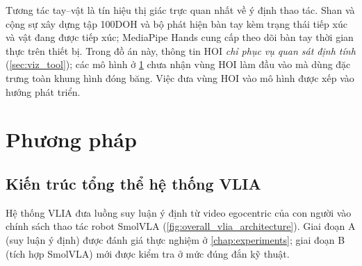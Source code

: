 \documentclass[12pt,a4paper]{report}
\begin{document}
Tương tác tay--vật là tín hiệu thị giác trực quan nhất về ý định thao tác. Shan và cộng sự \citep{shan2020100doh} xây dựng tập 100DOH và bộ phát hiện bàn tay kèm trạng thái tiếp xúc và vật đang được tiếp xúc; MediaPipe Hands \citep{zhang2020mediapipe} cung cấp theo dõi bàn tay thời gian thực trên thiết bị. Trong đồ án này, thông tin HOI \emph{chỉ phục vụ quan sát định tính} (\cref{sec:viz_tool}); các mô hình ở \cref{chap:method} chưa nhận vùng HOI làm đầu vào mà dùng đặc trưng toàn khung hình đóng băng. Việc đưa vùng HOI vào mô hình được xếp vào hướng phát triển.

\chapter{Phương pháp}
\label{chap:method}

\section{Kiến trúc tổng thể hệ thống VLIA}

Hệ thống VLIA đưa luồng suy luận ý định từ video egocentric của con người vào chính sách thao tác robot SmolVLA (\cref{fig:overall_vlia_architecture}). Giai đoạn A (suy luận ý định) được đánh giá thực nghiệm ở \cref{chap:experiments}; giai đoạn B (tích hợp SmolVLA) mới được kiểm tra ở mức đúng đắn kỹ thuật.
\end{document}
